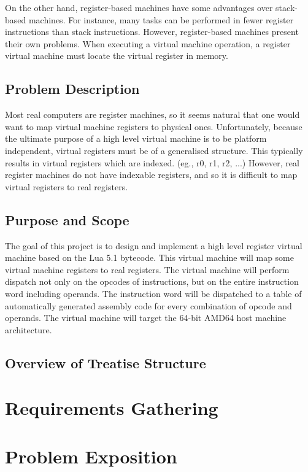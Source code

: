 	On the other hand, register-based machines have some advantages over stack-based machines. For instance, many tasks can be performed in fewer register instructions than stack instructions. \citep{caseregistervm} However, register-based machines present their own problems. When executing a virtual machine operation, a register virtual machine must locate the virtual register in memory. 
	
	\section{Problem Description}
	Most real computers are register machines,  so it seems natural that one would want to map virtual machine registers to physical ones. Unfortunately, because the ultimate purpose of a high level virtual machine is to be platform independent, virtual registers must be of a generalised structure. This typically results in virtual registers which are indexed. (eg., r0, r1, r2, ...) However, real register machines do not have indexable registers, and so it is difficult to map virtual registers to real registers.
	
	\section{Purpose and Scope}
	The goal of this project is to design and implement a high level register virtual machine based on the Lua 5.1 bytecode. This virtual machine will map some virtual machine registers to real registers. The virtual machine will perform dispatch not only on the opcodes of instructions, but on the entire instruction word including operands. The instruction word will be dispatched to a table of automatically generated assembly code for every combination of opcode and operands. The virtual machine will target the 64-bit AMD64 host machine architecture. 
	
	
	
	\section{Overview of Treatise Structure}

\chapter{Requirements Gathering}

\chapter{Problem Exposition}
